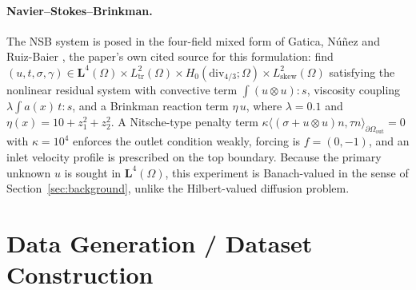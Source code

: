 \paragraph{Navier--Stokes--Brinkman.} The NSB system is posed in the
four-field mixed form of Gatica, N\'{u}\~{n}ez and Ruiz-Baier
\cite{gatica2022nsb}, the paper's own cited source for this formulation:
find $(u, t, \sigma, \gamma) \in \mathbf{L}^4(\Omega) \times L^2_{\mathrm{tr}}(\Omega)
\times H_0(\mathrm{div}_{4/3};\Omega) \times L^2_{\mathrm{skew}}(\Omega)$
satisfying the nonlinear residual system with convective term
$\int (u\otimes u):s$, viscosity coupling
$\lambda \int a(x)\,t : s$, and a Brinkman reaction term $\eta\, u$, where
$\lambda = 0.1$ and $\eta(x) = 10 + z_1^2 + z_2^2$. A Nitsche-type penalty
term $\kappa \langle (\sigma + u\otimes u)n, \tau n\rangle_{\partial\Omega_{\mathrm{out}}} = 0$
with $\kappa = 10^4$ enforces the outlet condition weakly, forcing is
$f = (0,-1)$, and an inlet velocity profile is prescribed on the top
boundary. Because the primary unknown $u$ is sought in
$\mathbf{L}^4(\Omega)$, this experiment is Banach-valued in the sense of
Section~\ref{sec:background}, unlike the Hilbert-valued diffusion problem.

\section{Data Generation / Dataset Construction}

